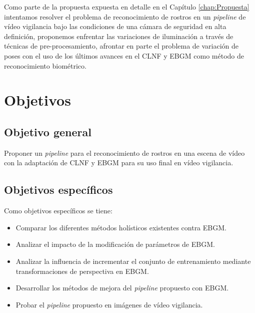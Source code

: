 Como parte de la propuesta expuesta en detalle en el Capítulo \ref{chap:Propuesta} intentamos resolver el problema de reconocimiento de rostros en un \textit{pipeline} de vídeo vigilancia bajo las condiciones de una cámara de seguridad en alta definición, proponemos enfrentar las variaciones de iluminación a través de técnicas de pre-procesamiento, afrontar en parte el problema de variación de poses con el uso de los últimos avances en el \acf{CLNF} y \acf{EBGM} como método de reconocimiento biométrico. 

\section{Objetivos}\label{scc:Objetivos}

\subsection{Objetivo general}
Proponer un \textit{pipeline} para el reconocimiento de rostros en una escena de vídeo con la adaptación de \acf{CLNF} y \acf{EBGM} para su uso final en vídeo vigilancia.

\subsection{Objetivos específicos}
Como objetivos específicos se tiene:
\begin{itemize}
\item Comparar los diferentes métodos holísticos existentes contra \ac{EBGM}.
\item Analizar el impacto de la modificación de parámetros de \ac{EBGM}.
\item Analizar la influencia de incrementar el conjunto de entrenamiento mediante transformaciones de perspectiva en \ac{EBGM}.
\item Desarrollar los métodos de mejora del \textit{pipeline} propuesto con \ac{EBGM}.
\item Probar el \textit{pipeline} propuesto en imágenes de vídeo vigilancia.
\end{itemize}

